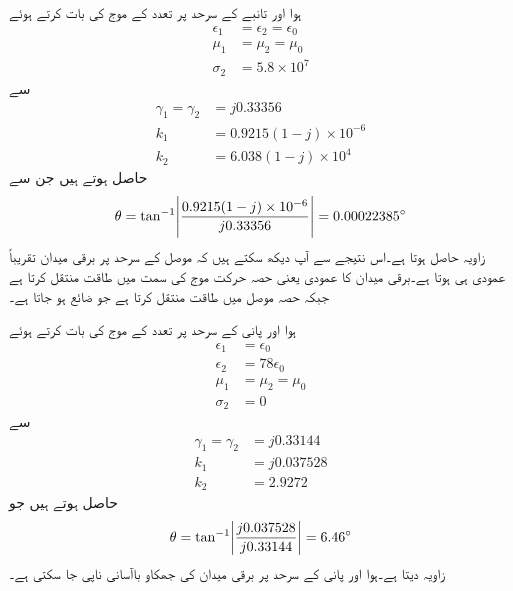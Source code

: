 ہوا اور تانبے کے سرحد پر  تعدد کے موج کی بات کرتے ہوئے
\begin{align*}
\epsilon_1&=\epsilon_2=\epsilon_0\\
\mu_1&=\mu_2=\mu_0\\
\sigma_2&=5.8\times 10^{7}
\end{align*}
سے
\begin{align*}
\gamma_1 =\gamma_2&= j 0.33356 \\
k_1&=0.9215(1-j) \times 10^{-6} \\
k_2&=6.038 (1-j)\times 10^4
\end{align*}
حاصل ہوتے ہیں جن سے
\begin{align*}
\theta=\tan^{-1} \abs{\frac{0.9215(1-j) \times 10^{-6}}{ j 0.33356}}=0.00022385^{\circ}
\end{align*}
زاویہ حاصل ہوتا  ہے۔اس نتیجے سے آپ دیکھ سکتے ہیں کہ موصل کے سرحد پر برقی میدان تقریباً عمودی ہی ہوتا ہے۔برقی میدان کا عمودی یعنی  حصہ حرکت موج کی سمت  میں طاقت منتقل کرتا ہے جبکہ  حصہ موصل میں طاقت منتقل کرتا ہے جو ضائع ہو جاتا ہے۔


ہوا اور پانی  کے سرحد پر  تعدد کے موج کی بات کرتے ہوئے
\begin{align*}
\epsilon_1&=\epsilon_0\\
\epsilon_2&=78 \epsilon_0\\
\mu_1&=\mu_2=\mu_0\\
\sigma_2&=0
\end{align*}
سے
\begin{align*}
\gamma_1 =\gamma_2&= j 0.33144 \\
k_1&=j 0.037528 \\
k_2&=2.9272
\end{align*}
حاصل ہوتے ہیں جو
\begin{align*}
\theta=\tan^{-1} \abs{\frac{j 0.037528 }{  j 0.33144}}=6.46^{\circ}
\end{align*}
زاویہ دیتا ہے۔ہوا اور پانی کے سرحد پر برقی میدان کی جھکاو باآسانی ناپی جا سکتی ہے۔


